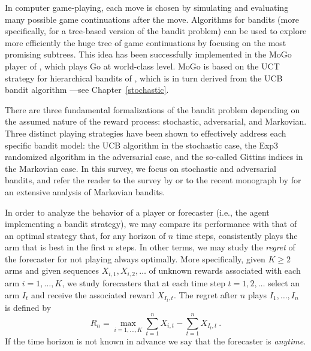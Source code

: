 In computer game-playing, each move is chosen by simulating and evaluating many possible game continuations after the move. Algorithms for bandits (more specifically, for a tree-based version of the bandit problem) can be used to explore more efficiently the huge tree of game continuations by focusing on the most promising subtrees. This idea has been successfully implemented in the MoGo player of \cite{GWMT06}, which plays Go at world-class level. MoGo is based on the UCT strategy for hierarchical bandits of \cite{KS06}, which is in turn derived from the UCB bandit algorithm ---see Chapter~\ref{stochastic}.

%
There are three fundamental formalizations of the bandit problem depending on the assumed nature of the reward process: stochastic, adversarial, and Markovian. Three distinct playing strategies have been shown to effectively address each specific bandit model: the UCB algorithm in the stochastic case, the Exp3 randomized algorithm in the adversarial case, and the so-called Gittins indices in the Markovian case. In this survey, we focus on stochastic and adversarial bandits, and refer the reader to the survey by \cite{mahajan2008multi} or to the recent monograph by \cite{GGW11} for an extensive analysis of Markovian bandits.

In order to analyze the behavior of a player or forecaster (i.e., the agent implementing a bandit strategy), we may compare its performance with that of an optimal strategy that, for any horizon of $n$ time steps, consistently plays the arm that is best in the first $n$ steps. In other terms, we may study the \textsl{regret} of the forecaster for not playing always optimally. More specifically, given $K \ge 2$ arms and given sequences $X_{i,1},X_{i,2},\dots$ of unknown rewards associated with each arm $i=1,\dots,K$, we study forecasters that at each time step $t=1,2,\dots$ select an arm $I_t$ and receive the associated reward $X_{I_t,t}$. The regret after $n$ plays $I_1,\dots,I_n$ is defined by
\begin{equation} \label{eq:regret}
    R_n = \max_{i=1,\hdots,K} \sum_{t=1}^n X_{i,t} - \sum_{t=1}^n X_{I_t,t}~.
\end{equation}
If the time horizon is not known in advance we say that the forecaster is {\em anytime}.

